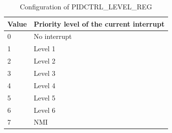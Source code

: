 \begin{table}[H]
    \centering
    \caption{Configuration of PIDCTRL\_LEVEL\_REG}
    \label{table:PIDCTRL_LEVEL_REG}
    \begin{tabular}{|p{5cm}|p{10cm}|}
        \hline
        \rowcolor{lightgray}
        Value& Priority level of the current interrupt \\
        \hline
        0 & No interrupt \\
        \hline
        1 & Level 1  \\
        \hline
        2 & Level 2  \\
        \hline
        3 & Level 3  \\
        \hline
        4 & Level 4  \\
        \hline
        5 & Level 5  \\
        \hline
        6 & Level 6  \\
        \hline
        7 & NMI \\
        \hline
    \end{tabular}
\end{table}